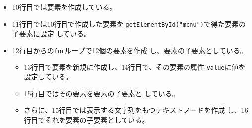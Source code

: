 \begin{Exec}
\begin{itemize}
 \item 10行目では要素を作成している。
 \item 11行目では10行目で作成した要素を
       \texttt{getElementById("menu")}で得た要素の子要素に設定
       している。 
 \item 12行目からの\texttt{for}ループで12個の要素を作成
       し、要素の子要素としている。
       \begin{itemize}
	\item 13行目で要素を新規に作成し、14行目で、その要素の属性
        \texttt{value}に値を設定している。
	\item 15行目ではその要素を要素の子要素と
	      している。
	\item さらに、15行目では表示する文字列をもつテキストノードを作成
	      し、16行目でそれを要素の子要素としている。
       \end{itemize}
\end{itemize}
\end{Exec}

